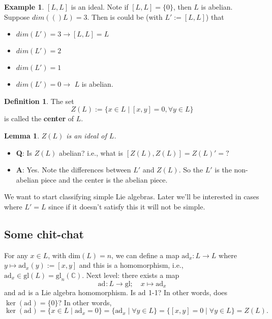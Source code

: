 \documentclass[12pt]{article}
\newtheorem{lemma}[theorem]{Lemma}
\theoremstyle{definition}
\newtheorem{definition}{Definition}[section]
\theoremstyle{definition}
\newtheorem{exmp}{Example}[section]
\newcommand{\ad}[1]{\text{ad}_{#1}}
\newcommand{\dm}[1]{ dim (#1) }
\begin{document}
        \begin{exmp}
            $[L, L]$ is an ideal. Note if $[L, L]=\{0\}$, then $L$ is abelian.
            Suppose $\dm(L)=3$. Then is could be (with $L':=[L, L]$) that 
                \begin{itemize}
                    \item$\dm{L'}=3\rightarrow[L, L]=L$
                    \item $\dm{L'}=2$
                    \item$\dm{L'}=1$
                    \item$\dm{L'}=0\rightarrow$ $L$ is abelian.
                \end{itemize}
        \end{exmp}
        \begin{definition}
            The set 
                \begin{equation*}
                    Z(L):=\{x\in L\mid[x, y]=0, \forall y\in L\}
                \end{equation*}
            is called the \textbf{center} of $L$.
        \end{definition}
        \begin{lemma}
            $Z(L)$ is an ideal of $L$.
        \end{lemma}
        \begin{itemize}
            \item\textbf{Q}: Is $Z(L)$ abelian? i.e., what is $[Z(L),
                Z(L)]=Z(L)'=?$
            \item\textbf{A}: Yes. Note the differences between $L'$ and $Z(L)$. So
                the $L'$ is the non-abelian piece and the center is the abelian
                piece. 
        \end{itemize}
        We want to start classifying simple Lie algebras. Later we'll be
        interested in cases where $L'=L$ since if it doesn't satisfy this it
        will not be simple. 
        \subsection{Some chit-chat}
        For any $x\in L$, with $\text{dim}(L)=n$, we can define a map $\ad{x}:L\to L$ where
        $y\mapsto\ad{x}(y):=[x, y]$ and this is a homomorphism, i.e.,
        $\ad{x}\in\text{gl}(L)=\text{gl}_{n}(\mathbb{C})$. Next level: there
        exists a map 
            \begin{equation}
                \ad{}:L\to\text{gl};\quad x\mapsto\ad{x}
            \end{equation}
        and $\ad{}$ is a Lie algebra homomorphism. Is $\ad{}$ 1-1? In other
        words, does $\ker(\ad{})=\{0\}$? In other words, 
            \begin{equation*}
                \ker(\ad{})=\{x\in L\mid \ad{x}=0\}=\{\ad{x}\mid\forall y\in
                L\}=\{[x, y]=0\mid \forall y\in L\}=Z(L).
            \end{equation*}
\end{document}
